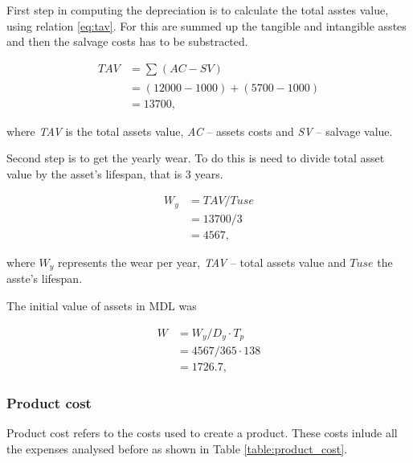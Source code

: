 First step in computing the depreciation is to calculate the total asstes value, using relation \eqref{eq:tav}. For this are summed up the tangible and intangible asstes and then the salvage costs has to be substracted. 

\begin{equation}\label{eq:tav}
 \begin{split}
  TAV &= \sum_{} (AC - SV) \\
        &= (12000 - 1000) + (5700 - 1000) \\
        &= 13700,
 \end{split}
\end{equation}

\noindent
where \textit{TAV} is the total assets value, \textit{AC} -- assets costs and \textit{SV} -- salvage value.

Second step is to get the yearly wear. To do this is need to divide total asset value by the asset's lifespan, that is 3 years.

\begin{equation}
 \begin{split}
  W_{y} &= TAV/T{use} \\
        &= 13700/3 \\
        &= 4567,
 \end{split}
\end{equation}

\noindent
where $W_{y}$ represents the wear per year, \textit{TAV} -- total assets value and $T{use}$ the asste's lifespan. 

The initial value of assets in MDL was

\begin{equation}
 \begin{split}
  W &= W_{y}/D_{y} \cdot T_{p} \\
    &= 4567/365 \cdot 138 \\
    &= 1726.7,
 \end{split}
\end{equation}

\subsubsection{Product cost}

Product cost refers to the costs used to create a product. These costs inlude all the expenses analysed before as shown in Table \ref{table:product_cost}.

